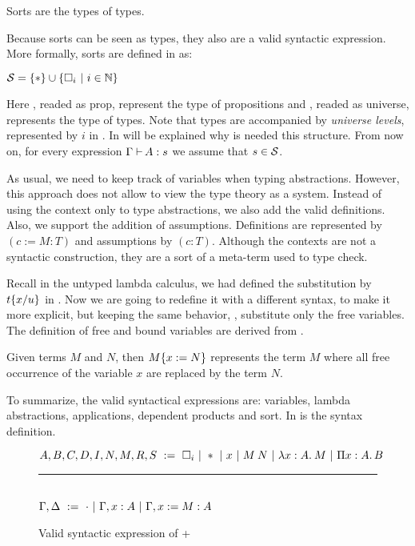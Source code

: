 \begin{Definition}[Sort] Sorts are the types of types.\end{Definition}
\noindent Because sorts can be seen as types, they also are a valid syntactic expression. More formally,
sorts are defined in \CCw{} as:
\begin{center}
    $\Sort{} = \{\Prop\} \cup \{\Type{}\ |\ i\in\Nat\} $
\end{center}
Here \Prop{}, readed as prop, represent the type of propositions and \Type{}, readed as universe,
represents the type of types. Note that types are accompanied by \emph{universe levels}, 
represented by $i$ in \Type{}. In  will be explained why is needed this structure. 
From now on, for every expression $\ctyping{A}{s}$ we assume that $s\in\Sort$.

As usual, we need to keep track of variables when typing abstractions. However, this approach does not allow
to view the type theory as a system. Instead of using the context only to type abstractions, we also add
the valid definitions. Also, we support the addition of assumptions. Definitions are represented by 
$(c:=M:T)$ and assumptions by $(c:T)$.
Although the contexts 
are not a syntactic construction, they are a sort of a meta-term used to type check. 

Recall in the untyped lambda calculus, we had defined the substitution by $\untypedSubst{t}{u}{x}$ in 
. Now we are 
going to redefine it with a different syntax, to make it more explicit, but keeping the same behavior, \ie{}, 
substitute only the free variables. The definition of free and bound variables are derived from 
.
\begin{Definition}
Given terms $M$ and $N$, then $\subst{M}{x}{N}$ represents the term $M$ where all free occurrence of the 
variable $x$ are replaced by the term $N$.
\end{Definition}

To summarize, the valid syntactical expressions are: variables, lambda abstractions, applications, dependent
products and sort. In  is the syntax definition.

\begin{figure}
    \centering
    $A,B,C,D,I,N,M,R,S\ \termDef\ \Type\ |\ \Prop\ |\ x\ |\ \app{M}{N}\ |\ \abs{x}{A}{M}\ |\ \vardepArrow{A}{B}$\\
    \rule{0.75\textwidth}{0.4pt}\vspace{4pt}\\
    $\Context,\varContext\ \termDef\ \EContext\ |\ \Context,\typing{x}{A}\ |\ 
                                      \Context,\definitionWtype{x}{M}{A}$ %
    \caption{Valid syntactic expression of \CCw{} + \Prop{}}
    \label{fig:CCwExpression}
\end{figure}

